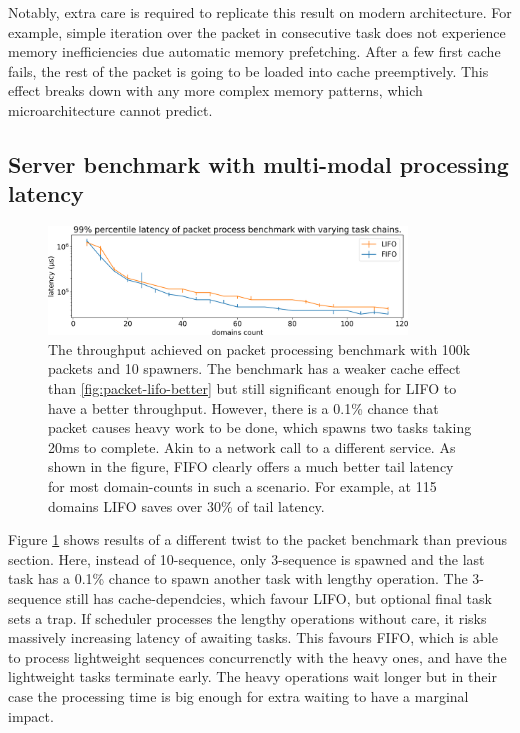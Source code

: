 \documentclass[12pt,a4paper,twoside]{report}
\begin{document}
Notably, extra care is required to replicate this result on modern architecture. For example, simple iteration over the packet in consecutive task does not experience memory inefficiencies due automatic memory prefetching. After a few first cache fails, the rest of the packet is going to be loaded into cache preemptively. This effect breaks down with any more complex memory patterns, which microarchitecture cannot predict.   

\subsection{Server benchmark with multi-modal processing latency}
\label{section:server-bench-with-multi-modal}

\begin{figure} 
    \centering 
    \includegraphics[width=0.85\textwidth]{eval/packet-basic-fifo-better.png}
    \caption{The throughput achieved on packet processing benchmark with 100k packets and 10 spawners. The benchmark has a weaker cache effect than \ref{fig:packet-lifo-better} but still significant enough for LIFO to have a better throughput. However, there is a 0.1\% chance that packet causes heavy work to be done, which spawns two tasks taking 20ms to complete. Akin to a network call to a different service. As shown in the figure, FIFO clearly offers a much better tail latency for most domain-counts in such a scenario. For example, at 115 domains LIFO saves over 30\% of tail latency.}
   \label{fig:packet-fifo-better}
\end{figure}

Figure \ref{fig:packet-fifo-better} shows results of a different twist to the packet benchmark than previous section. Here, instead of 10-sequence, only 3-sequence is spawned and the last task has a 0.1\% chance to spawn another task with lengthy operation. The 3-sequence still has cache-dependcies, which favour LIFO, but optional final task sets a trap. If scheduler processes the lengthy operations without care, it risks massively increasing latency of awaiting tasks. This favours FIFO, which is able to process lightweight sequences concurrenctly with the heavy ones, and have the lightweight tasks terminate early. The heavy operations wait longer but in their case the processing time is big enough for extra waiting to have a marginal impact. 
\end{document}
